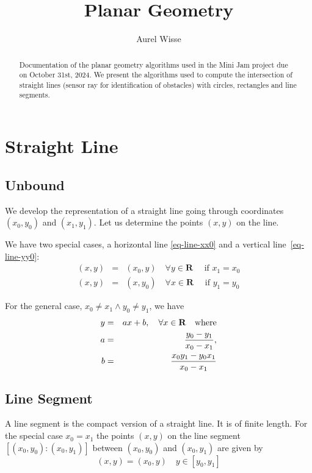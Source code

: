 \documentclass[11pt]{article}
\newcommand{\Rb}{{\mathbf{R}}}
\begin{document}
%
%
\title{Planar Geometry}
\author{Aurel Wisse}
\maketitle
%
%
\begin{abstract}
Documentation of the planar geometry algorithms used in the
Mini Jam project due on October 31st, 2024. We present the algorithms used to
compute the intersection of straight lines (sensor ray for identification
of obstacles) with circles, rectangles and line segments.
\end{abstract}

%
\section{Straight Line}
\label{sec-straight-line}

\subsection{Unbound}
\label{sec:unbound}
We develop the representation of a straight line going through
coordinates $(x_0, y_0)$ and $(x_1, y_1)$. Let us determine the points $(x,
y)$ on the line.

We have two special cases, a horizontal line \eqref{eq-line-xx0} and a
vertical line~\eqref{eq-line-yy0}:
\begin{eqnarray}
    (x, y) &=& (x_0, y)\quad\forall y\in\Rb\quad \text{ if } x_1 = x_0
    \label{eq-line-xx0} \\
    (x, y) &=& (x, y_0)\quad\forall x\in\Rb\quad \text{ if } y_1 = y_0
    \label{eq-line-yy0}
\end{eqnarray}

For the general case, $x_0 \neq x_1 \land y_0 \neq y_1$, we have
\begin{eqnarray}
    y &=& ax+b,\quad \forall x\in\Rb\quad \text{where}\label{eq-line-general}\\
    a &=& \frac{y_0 - y_1}{x_0 - x_1}, \notag \\
    b &=& \frac{x_0 y_1 - y_0 x_1}{x_0 - x_1} \notag
\end{eqnarray}

\subsection{Line Segment}
\label{sec-line-segment}
A line segment is the compact version of a straight line. It is of finite
length. For the special case $x_0 = x_1$ the points $(x, y)$ on the line
segment $[(x_0, y_0):(x_0, y_1)]$ between $(x_0, y_0)$ and $(x_0, y_1)$ are
given by
\begin{equation}
    (x, y) = (x_0, y)\quad y\in [y_0, y_1]\label{eq-seg-x1x0}
\end{equation}
\end{document}

